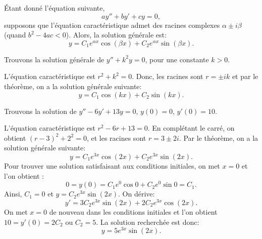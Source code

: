 \begin{theorem}
	Étant donné l'équation suivante,
	\begin{equation*}
		ay'' + by' + cy = 0,  
	\end{equation*}
	supposons que l'équation caractéristique admet des racines complexes $\alpha \pm i \beta$
	(quand $b^2 - 4ac < 0$).
	Alors, la solution générale est: 
	\begin{equation*}
		y = C_1 e^{\alpha x} \cos (\beta x) + C_2 e^{\alpha x} \sin (\beta x) .
	\end{equation*}
\end{theorem}

\begin{example} \label{example:sincossecondorder}
	Trouvons la solution générale de $y'' + k^2 y = 0$, pour une constante  $k > 0$.
	
	L'équation caractéristique est  $r^2 + k^2 = 0$.  
	Donc, les racines sont $r = \pm ik$ et par le théorème, on a la solution générale  suivante:
	\begin{equation*}
		y = C_1 \cos (kx) + C_2 \sin (kx) .
	\end{equation*}
\end{example}

\begin{example}
	Trouvons la solution de  $y'' - 6 y' + 13 y = 0$, $y(0) = 0$, $y'(0) = 10$.
	
	L'équation caractéristique est  $r^2 - 6 r + 13 = 0$. 
	En complétant le carré, on obtient   ${(r-3)}^2 + 2^2 = 0$, et les racines sont
	$r = 3 \pm 2i$.
	Par le théorème, on a la solution générale suivante:
	\begin{equation*}
		y = C_1 e^{3x} \cos (2x) + C_2 e^{3x} \sin (2x) .
	\end{equation*}
	Pour trouver une solution satisfaisant aux conditions initiales, on met $x=0$ et l'on obtient :
	\begin{equation*}
		0 = y(0) = C_1 e^{0} \cos 0 + C_2 e^{0} \sin 0  = C_1 .
	\end{equation*}
	Ainsi, $C_1 = 0$ et $y = C_2 e^{3x} \sin (2x)$.  On dérive: 
	\begin{equation*}
		y' = 3C_2 e^{3x} \sin (2x) + 2C_2 e^{3x} \cos (2x) .
	\end{equation*}
	On met $x=0$ de nouveau dans les conditions initiales et l'on obtient  $10 = y'(0) = 2C_2$ ou
	$C_2 = 5$.  La solution recherchée est donc:
	\begin{equation*}
		y = 5 e^{3x} \sin (2x) .
	\end{equation*}
\end{example}

